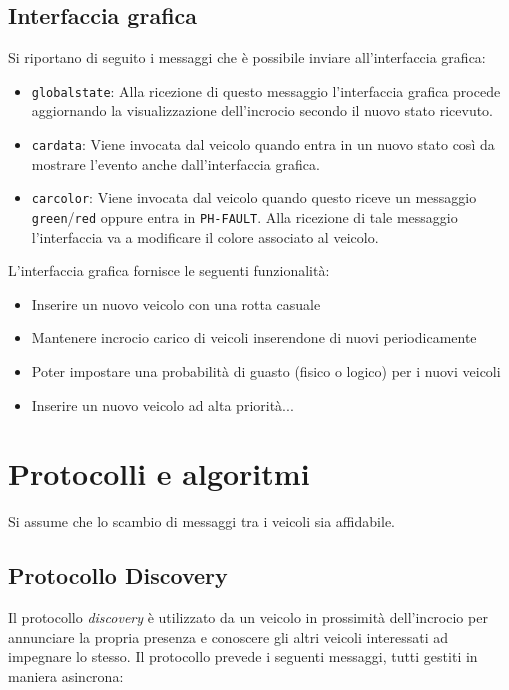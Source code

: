 \documentclass{memoir}
\begin{document}
\subsection{Interfaccia grafica}

Si riportano di seguito i messaggi che è possibile inviare all'interfaccia grafica:
\begin{itemize}
\item \texttt{globalstate}: Alla ricezione di questo messaggio l’interfaccia
  grafica procede aggiornando la visualizzazione dell’incrocio secondo il nuovo
  stato ricevuto.
\item \texttt{cardata}: Viene invocata dal veicolo quando entra in un nuovo
  stato così da mostrare l'evento anche dall'interfaccia grafica.
\item \texttt{carcolor}: Viene invocata dal veicolo quando questo riceve un
  messaggio \texttt{green}/\texttt{red} oppure entra in \texttt{PH-FAULT}. Alla
  ricezione di tale messaggio l’interfaccia va a modificare il colore associato
  al veicolo.
\end{itemize}

L'interfaccia grafica fornisce le seguenti funzionalità:
\begin{itemize}
\item Inserire un nuovo veicolo con una rotta casuale
\item Mantenere incrocio carico di veicoli inserendone di nuovi periodicamente
\item Poter impostare una probabilità di guasto (fisico o logico) per i nuovi veicoli
\item Inserire un nuovo veicolo ad alta priorità...
\end{itemize}

\section{Protocolli e algoritmi}
\label{sec:protalg}

Si assume che lo scambio di messaggi tra i veicoli sia affidabile.

\subsection{Protocollo Discovery}
Il protocollo \emph{discovery} è utilizzato da un veicolo in prossimità
dell'incrocio per annunciare la propria presenza e conoscere gli altri veicoli
interessati ad impegnare lo stesso. Il protocollo prevede i seguenti messaggi,
tutti gestiti in maniera asincrona:
\end{document}
